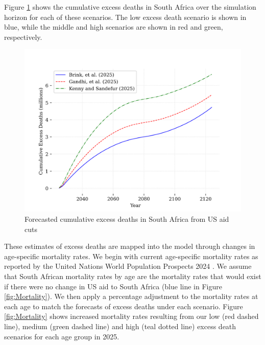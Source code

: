 \documentclass[letterpaper,12pt]{article}
\theoremstyle{definition}
\begin{document}
\begin{spacing}{1.5}
Figure \ref{fig:cumDeaths} shows the cumulative excess deaths in South Africa over the simulation horizon for each of these scenarios. The low excess death scenario is shown in blue, while the middle and high scenarios are shown in red and green, respectively.

\begin{figure}[H]
    \caption{Forecasted cumulative excess deaths in South Africa from US aid cuts}
    \label{fig:cumDeaths}
    \centering
    \includegraphics[scale=0.75]{./tables_figures/cumulative_excess_deaths.png}
\end{figure}

These estimates of excess deaths are mapped into the model through changes in age-specific mortality rates. We begin with current age-specific mortality rates as reported by the United Nations World Population Prospects 2024 \citep{UN2024}. We assume that South African mortality rates by age are the mortality rates that would exist if there were no change in US aid to South Africa (blue line in Figure \ref{fig:Mortality}). We then apply a percentage adjustment to the mortality rates at each age to match the forecasts of excess deaths under each scenario. Figure \ref{fig:Mortality} shows increased mortality rates resulting from our low (red dashed line), medium (green dashed line) and high (teal dotted line) excess death scenarios for each age group in 2025.



\end{spacing}
\end{document}
